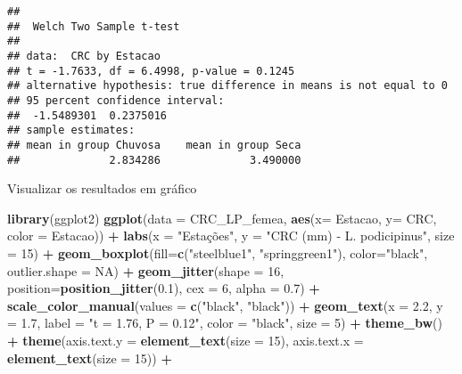 \documentclass[
]{book}
\newenvironment{Shaded}{\begin{snugshade}}{\end{snugshade}}
\newcommand{\DataTypeTok}[1]{\textcolor[rgb]{0.13,0.29,0.53}{#1}}
\newcommand{\DecValTok}[1]{\textcolor[rgb]{0.00,0.00,0.81}{#1}}
\newcommand{\FloatTok}[1]{\textcolor[rgb]{0.00,0.00,0.81}{#1}}
\newcommand{\KeywordTok}[1]{\textcolor[rgb]{0.13,0.29,0.53}{\textbf{#1}}}
\newcommand{\NormalTok}[1]{#1}
\newcommand{\OperatorTok}[1]{\textcolor[rgb]{0.81,0.36,0.00}{\textbf{#1}}}
\newcommand{\OtherTok}[1]{\textcolor[rgb]{0.56,0.35,0.01}{#1}}
\newcommand{\StringTok}[1]{\textcolor[rgb]{0.31,0.60,0.02}{#1}}
\begin{document}
\begin{verbatim}
## 
## 	Welch Two Sample t-test
## 
## data:  CRC by Estacao
## t = -1.7633, df = 6.4998, p-value = 0.1245
## alternative hypothesis: true difference in means is not equal to 0
## 95 percent confidence interval:
##  -1.5489301  0.2375016
## sample estimates:
## mean in group Chuvosa    mean in group Seca 
##              2.834286              3.490000
\end{verbatim}

Visualizar os resultados em gráfico

\begin{Shaded}
\begin{Highlighting}[]
\KeywordTok{library}\NormalTok{(ggplot2)}
\KeywordTok{ggplot}\NormalTok{(}\DataTypeTok{data =}\NormalTok{ CRC_LP_femea, }\KeywordTok{aes}\NormalTok{(}\DataTypeTok{x=}\NormalTok{ Estacao, }\DataTypeTok{y=}\NormalTok{ CRC, }\DataTypeTok{color =}\NormalTok{ Estacao)) }\OperatorTok{+}\StringTok{ }
\StringTok{  }\KeywordTok{labs}\NormalTok{(}\DataTypeTok{x =} \StringTok{"Estações"}\NormalTok{, }\DataTypeTok{y =} \StringTok{"CRC (mm) - L. podicipinus"}\NormalTok{, }\DataTypeTok{size =} \DecValTok{15}\NormalTok{) }\OperatorTok{+}
\StringTok{  }\KeywordTok{geom_boxplot}\NormalTok{(}\DataTypeTok{fill=}\KeywordTok{c}\NormalTok{(}\StringTok{"steelblue1"}\NormalTok{, }\StringTok{"springgreen1"}\NormalTok{), }\DataTypeTok{color=}\StringTok{"black"}\NormalTok{, }\DataTypeTok{outlier.shape =} \OtherTok{NA}\NormalTok{) }\OperatorTok{+}
\StringTok{  }\KeywordTok{geom_jitter}\NormalTok{(}\DataTypeTok{shape =} \DecValTok{16}\NormalTok{, }\DataTypeTok{position=}\KeywordTok{position_jitter}\NormalTok{(}\FloatTok{0.1}\NormalTok{), }\DataTypeTok{cex =} \DecValTok{6}\NormalTok{, }\DataTypeTok{alpha =} \FloatTok{0.7}\NormalTok{) }\OperatorTok{+}
\StringTok{  }\KeywordTok{scale_color_manual}\NormalTok{(}\DataTypeTok{values =} \KeywordTok{c}\NormalTok{(}\StringTok{"black"}\NormalTok{, }\StringTok{"black"}\NormalTok{)) }\OperatorTok{+}
\StringTok{  }\KeywordTok{geom_text}\NormalTok{(}\DataTypeTok{x =} \FloatTok{2.2}\NormalTok{, }\DataTypeTok{y =} \FloatTok{1.7}\NormalTok{, }\DataTypeTok{label =} \StringTok{"t = 1.76, P = 0.12"}\NormalTok{, }\DataTypeTok{color =} \StringTok{"black"}\NormalTok{, }\DataTypeTok{size =} \DecValTok{5}\NormalTok{) }\OperatorTok{+}
\StringTok{  }\KeywordTok{theme_bw}\NormalTok{() }\OperatorTok{+}
\StringTok{  }\KeywordTok{theme}\NormalTok{(}\DataTypeTok{axis.text.y =} \KeywordTok{element_text}\NormalTok{(}\DataTypeTok{size =} \DecValTok{15}\NormalTok{), }\DataTypeTok{axis.text.x =} \KeywordTok{element_text}\NormalTok{(}\DataTypeTok{size =} \DecValTok{15}\NormalTok{)) }\OperatorTok{+}

\end{Highlighting}
\end{Shaded}
\end{document}
